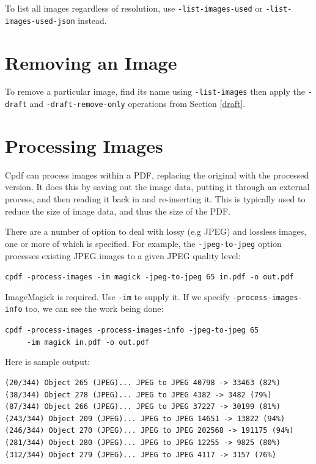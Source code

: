 \documentclass{book}
\begin{document}
\noindent To list all images regardless of resolution, use \texttt{-list-images-used} or \texttt{-list-images-used-json} instead.

\section{Removing an Image}

To remove a particular image, find its name using \texttt{-list-images} then apply the \texttt{-draft} and \texttt{-draft-remove-only} operations from Section \ref{draft}. 

\section{Processing Images}

Cpdf can process images within a PDF, replacing the original with the processed version. It does this by saving out the image data, putting it through an external process, and then reading it back in and re-inserting it. This is typically used to reduce the size of image data, and thus the size of the PDF.

There are a number of option to deal with lossy (e.g JPEG) and lossless images, one or more of which is specified. For example, the \texttt{-jpeg-to-jpeg} option processes existing JPEG images to a given JPEG quality level:

  \begin{framed}
  \noindent\small\verb!cpdf -process-images -im magick -jpeg-to-jpeg 65 in.pdf -o out.pdf!
  \end{framed}

\noindent ImageMagick is required. Use \texttt{-im} to supply it. If we specify \texttt{-process-images-info} too, we can see the work being done:

  \begin{framed}
  \noindent\small\verb!cpdf -process-images -process-images-info -jpeg-to-jpeg 65!\\
  \noindent\small\verb!     -im magick in.pdf -o out.pdf!
  \end{framed}

\noindent Here is sample output:

\begin{framed}
{\small\begin{verbatim}
(20/344) Object 265 (JPEG)... JPEG to JPEG 40798 -> 33463 (82%)
(38/344) Object 278 (JPEG)... JPEG to JPEG 4382 -> 3482 (79%)
(87/344) Object 266 (JPEG)... JPEG to JPEG 37227 -> 30199 (81%)
(243/344) Object 209 (JPEG)... JPEG to JPEG 14651 -> 13822 (94%)
(246/344) Object 270 (JPEG)... JPEG to JPEG 202568 -> 191175 (94%)
(281/344) Object 280 (JPEG)... JPEG to JPEG 12255 -> 9825 (80%)
(312/344) Object 279 (JPEG)... JPEG to JPEG 4117 -> 3157 (76%)
\end{verbatim}}
  \end{framed}
\end{document}
